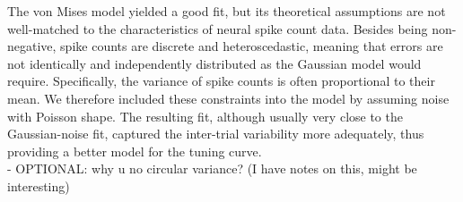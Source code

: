 \documentclass[10pt]{article}
\begin{document}
The von Mises model yielded a good fit, but its theoretical assumptions are not well-matched to the characteristics of neural spike count data. Besides being non-negative, spike counts are discrete and heteroscedastic, meaning that errors are not identically and independently distributed as the Gaussian model would require. Specifically, the variance of spike counts is often proportional to their mean. We therefore included these constraints into the model by assuming noise with Poisson shape. The resulting fit, although usually very close to the Gaussian-noise fit, captured the inter-trial variability more adequately, thus providing a better model for the tuning curve. \\

- OPTIONAL: why u no circular variance? (I have notes on this, might be interesting)



\end{document}
